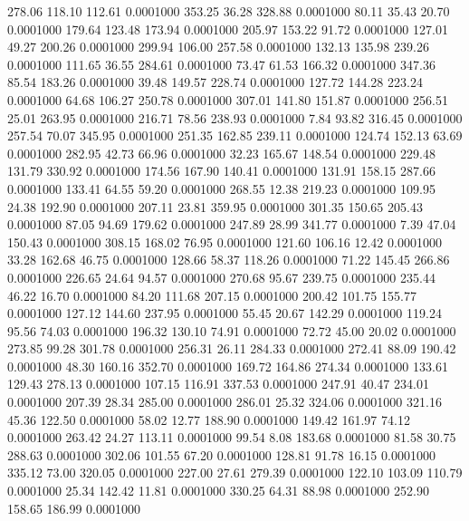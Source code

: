  278.06  118.10  112.61   0.0001000
 353.25   36.28  328.88   0.0001000
  80.11   35.43   20.70   0.0001000
 179.64  123.48  173.94   0.0001000
 205.97  153.22   91.72   0.0001000
 127.01   49.27  200.26   0.0001000
 299.94  106.00  257.58   0.0001000
 132.13  135.98  239.26   0.0001000
 111.65   36.55  284.61   0.0001000
  73.47   61.53  166.32   0.0001000
 347.36   85.54  183.26   0.0001000
  39.48  149.57  228.74   0.0001000
 127.72  144.28  223.24   0.0001000
  64.68  106.27  250.78   0.0001000
 307.01  141.80  151.87   0.0001000
 256.51   25.01  263.95   0.0001000
 216.71   78.56  238.93   0.0001000
   7.84   93.82  316.45   0.0001000
 257.54   70.07  345.95   0.0001000
 251.35  162.85  239.11   0.0001000
 124.74  152.13   63.69   0.0001000
 282.95   42.73   66.96   0.0001000
  32.23  165.67  148.54   0.0001000
 229.48  131.79  330.92   0.0001000
 174.56  167.90  140.41   0.0001000
 131.91  158.15  287.66   0.0001000
 133.41   64.55   59.20   0.0001000
 268.55   12.38  219.23   0.0001000
 109.95   24.38  192.90   0.0001000
 207.11   23.81  359.95   0.0001000
 301.35  150.65  205.43   0.0001000
  87.05   94.69  179.62   0.0001000
 247.89   28.99  341.77   0.0001000
   7.39   47.04  150.43   0.0001000
 308.15  168.02   76.95   0.0001000
 121.60  106.16   12.42   0.0001000
  33.28  162.68   46.75   0.0001000
 128.66   58.37  118.26   0.0001000
  71.22  145.45  266.86   0.0001000
 226.65   24.64   94.57   0.0001000
 270.68   95.67  239.75   0.0001000
 235.44   46.22   16.70   0.0001000
  84.20  111.68  207.15   0.0001000
 200.42  101.75  155.77   0.0001000
 127.12  144.60  237.95   0.0001000
  55.45   20.67  142.29   0.0001000
 119.24   95.56   74.03   0.0001000
 196.32  130.10   74.91   0.0001000
  72.72   45.00   20.02   0.0001000
 273.85   99.28  301.78   0.0001000
 256.31   26.11  284.33   0.0001000
 272.41   88.09  190.42   0.0001000
  48.30  160.16  352.70   0.0001000
 169.72  164.86  274.34   0.0001000
 133.61  129.43  278.13   0.0001000
 107.15  116.91  337.53   0.0001000
 247.91   40.47  234.01   0.0001000
 207.39   28.34  285.00   0.0001000
 286.01   25.32  324.06   0.0001000
 321.16   45.36  122.50   0.0001000
  58.02   12.77  188.90   0.0001000
 149.42  161.97   74.12   0.0001000
 263.42   24.27  113.11   0.0001000
  99.54    8.08  183.68   0.0001000
  81.58   30.75  288.63   0.0001000
 302.06  101.55   67.20   0.0001000
 128.81   91.78   16.15   0.0001000
 335.12   73.00  320.05   0.0001000
 227.00   27.61  279.39   0.0001000
 122.10  103.09  110.79   0.0001000
  25.34  142.42   11.81   0.0001000
 330.25   64.31   88.98   0.0001000
 252.90  158.65  186.99   0.0001000
